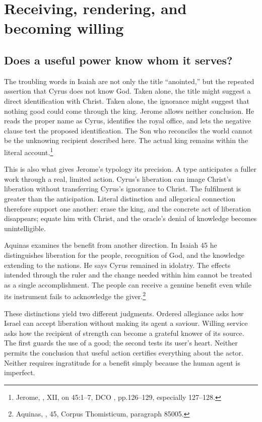 \clearpage
\section{Receiving, rendering, and becoming willing}
\subsection{Does a useful power know whom it serves?}
The troubling words in Isaiah are not only the title ``anointed,'' but the repeated assertion that Cyrus does not know God. Taken alone, the title might suggest a direct identification with Christ. Taken alone, the ignorance might suggest that nothing good could come through the king. Jerome allows neither conclusion. He reads the proper name as Cyrus, identifies the royal office, and lets the negative clause test the proposed identification. The Son who reconciles the world cannot be the unknowing recipient described here. The actual king remains within the literal account.\footnote{Jerome, , XII, on 45:1--7, DCO , pp.126--129, especially 127--128.}

This is also what gives Jerome's typology its precision. A type anticipates a fuller work through a real, limited action. Cyrus's liberation can image Christ's liberation without transferring Cyrus's ignorance to Christ. The fulfilment is greater than the anticipation. Literal distinction and allegorical connection therefore support one another: erase the king, and the concrete act of liberation disappears; equate him with Christ, and the oracle's denial of knowledge becomes unintelligible.

Aquinas examines the benefit from another direction. In Isaiah 45 he distinguishes liberation for the people, recognition of God, and the knowledge extending to the nations. He says Cyrus remained in idolatry. The effects intended through the ruler and the change needed within him cannot be treated as a single accomplishment. The people can receive a genuine benefit even while its instrument fails to acknowledge the giver.\footnote{Aquinas, , 45, Corpus Thomisticum, paragraph 85005.}

These distinctions yield two different judgments. Ordered allegiance asks how Israel can accept liberation without making its agent a saviour. Willing service asks how the recipient of strength can become a grateful knower of its source. The first guards the use of a good; the second tests its user's heart. Neither permits the conclusion that useful action certifies everything about the actor. Neither requires ingratitude for a benefit simply because the human agent is imperfect.

